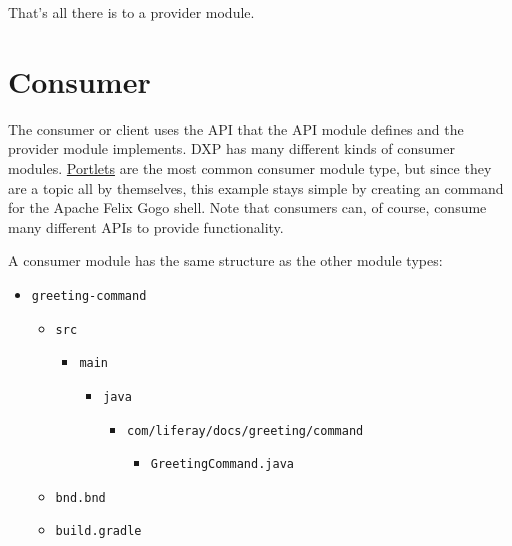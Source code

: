 That's all there is to a provider module.

\section{Consumer}\label{consumer}

The consumer or client uses the API that the API module defines and the
provider module implements. DXP has many different kinds of consumer
modules.
\href{/docs/7-2/frameworks/-/knowledge_base/f/portlets}{Portlets} are
the most common consumer module type, but since they are a topic all by
themselves, this example stays simple by creating an command for the
Apache Felix Gogo shell. Note that consumers can, of course, consume
many different APIs to provide functionality.

A consumer module has the same structure as the other module types:

\begin{itemize}
\tightlist
\item
  \texttt{greeting-command}

  \begin{itemize}
  \tightlist
  \item
    \texttt{src}

    \begin{itemize}
    \tightlist
    \item
      \texttt{main}

      \begin{itemize}
      \tightlist
      \item
        \texttt{java}

        \begin{itemize}
        \tightlist
        \item
          \texttt{com/liferay/docs/greeting/command}

          \begin{itemize}
          \tightlist
          \item
            \texttt{GreetingCommand.java}
          \end{itemize}
        \end{itemize}
      \end{itemize}
    \end{itemize}
  \item
    \texttt{bnd.bnd}
  \item
    \texttt{build.gradle}
  \end{itemize}
\end{itemize}

